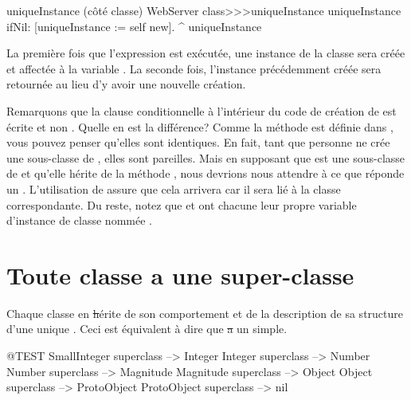 \documentclass[a4paper,10pt,twoside]{book}
\begin{document}
\begin{method}[uniqueInstance]{uniqueInstance (c\^ot\'e classe)}
WebServer class>>>uniqueInstance
     uniqueInstance ifNil: [uniqueInstance := self new].
     ^ uniqueInstance
\end{method}

La premi\`ere fois que l'expression  est ex\'ecut\'ee, une instance de la classe  sera cr\'e\'ee et affect\'ee \`a la variable . 
La seconde fois, l'instance pr\'ec\'edemment cr\'e\'ee sera retourn\'ee au lieu d'y avoir une nouvelle cr\'eation. 

Remarquons que la clause conditionnelle \`a l'int\'erieur du code de cr\'eation
de  est \'ecrite  et non 
\mbox{.}
Quelle en est la diff\'erence?   Comme la m\'ethode  est d\'efinie dans , vous pouvez penser qu'elles sont identiques.    En fait, tant que personne ne cr\'ee une sous-classe de , elles sont pareilles. Mais en supposant que  est une sous-classe de  et qu'elle h\'erite de la m\'ethode ,
nous devrions nous attendre \`a ce que  r\'eponde un . L'utilisation de \self assure que cela arrivera car il sera li\'e \`a la classe correspondante.
Du reste, notez que  et  ont chacune
leur propre variable d'instance de classe nomm\'ee .  


\section{Toute classe a une super-classe}


Chaque classe en \st h\'erite de son comportement et de la description
de sa structure d'une unique .
Ceci est \'equivalent \`a dire que \st a un  simple.

\begin{code}{@TEST}
SmallInteger superclass --> Integer
Integer superclass          --> Number
Number superclass        --> Magnitude
Magnitude superclass    --> Object
Object superclass           --> ProtoObject
ProtoObject superclass  --> nil
\end{code}
\end{document}
